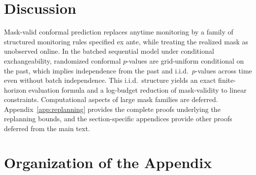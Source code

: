 \documentclass{uai2026} %
\newcommand{\1}{\mathbf{1}}
\newcommand{\prob}{\mathbb{P}}
\newcommand{\mcal}{\mathcal{M}}
\newcommand{\acal}{\mathcal{A}}
\begin{document}
\section{Discussion}
\label{sec:discussion}

Mask-valid conformal prediction replaces anytime monitoring by a family of structured monitoring rules specified ex ante, while treating the realized mask as unobserved online.
In the batched sequential model under conditional exchangeability, randomized conformal $p$-values are grid-uniform conditional on the past, which implies independence from the past and i.i.d.\ $p$-values across time even without batch independence.
This i.i.d.\ structure yields an exact finite-horizon evaluation formula and a log-budget reduction of mask-validity to linear constraints.
Computational aspects of large mask families are deferred.
Appendix~\ref{app:replanning} provides the complete proofs underlying the replanning bounds, and the section-specific appendices provide other proofs deferred from the main text.


\appendix
\onecolumn

\section*{Organization of the Appendix}
\end{document}
